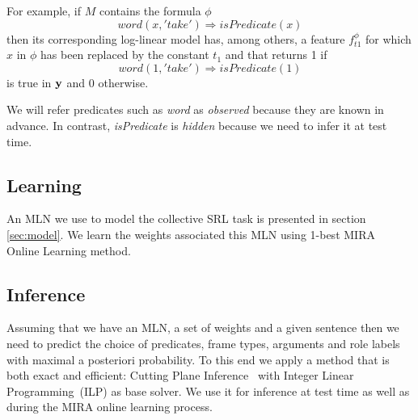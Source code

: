 For example, if $M$ contains the formula $\phi$ \[
word\left(x,'take'\right)\Rightarrow isPredicate\left(x\right)\]
then its corresponding log-linear model has, among others, a feature 
$f_{t1}^{\phi}$ for which $x$ in $\phi$ has been replaced by the constant $t_1$ and that returns 1 if \[
word\left(1,'take'\right)\Rightarrow isPredicate\left(1\right)\]
is true in $\mathbf{y}$ and 0 otherwise.

We will refer predicates such as \emph{word} as \emph{observed} because they are known in advance. In contrast, \emph{isPredicate} is \emph{hidden} because we need to infer it at test time.

\subsection{Learning}

An MLN we use to model the collective SRL task is presented in section \ref{sec:model}. We learn the weights associated this MLN using 1-best MIRA~\citep{crammer01ultraconservative} Online Learning method. %

\subsection{Inference}


Assuming that we have an MLN, a set of weights and a given sentence then we need to predict the choice of predicates, frame types, arguments and role labels with maximal a posteriori probability. To this end we apply a method that is both exact and efficient: Cutting Plane Inference~\citep[CPI,][]{riedel08improving} with Integer Linear Programming~(ILP) as base solver. We use it for inference at test time as well as during the MIRA online learning process.

